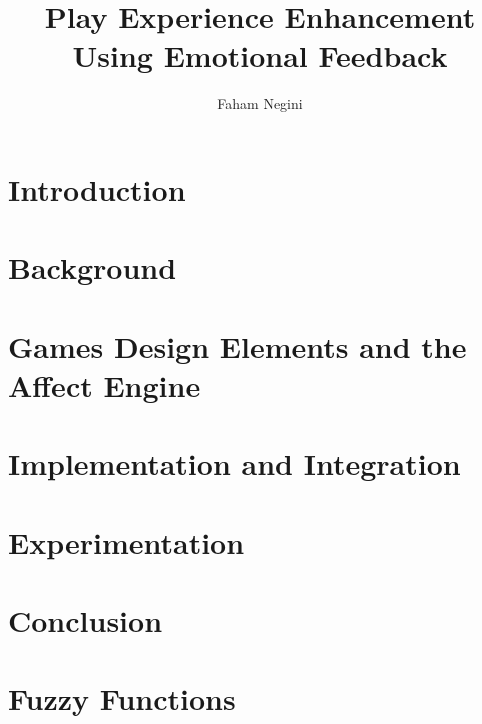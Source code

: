 \documentclass{uofsthesis-cs}
\title{Play Experience Enhancement Using Emotional Feedback}
\author{Faham Negini}
\begin{document}
\maketitle

\frontmatter


\chapter{Introduction}                                
\chapter{Background}                                  
\chapter{Games Design Elements and the Affect Engine} 
\chapter{Implementation and Integration}              
\chapter{Experimentation}                             
\chapter{Conclusion}                                  




\uofsappendix
\chapter{Fuzzy Functions} 

\end{document}
